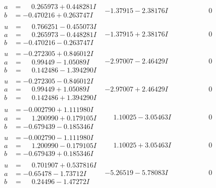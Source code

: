 \documentclass[1p]{elsarticle_modified}
\theoremstyle{definition}
\begin{document}
$$\begin{array}{c|c|c}
\begin{aligned}
a &= \phantom{-}0.265973 + 0.448281 I \\
b &= -0.470216 + 0.263747 I\end{aligned}
 & -1.37915 - 2.38176 I & \phantom{-0.000000 } 0 \\ \hline\begin{aligned}
u &= \phantom{-}0.766251 - 0.455073 I \\
a &= \phantom{-}0.265973 - 0.448281 I \\
b &= -0.470216 - 0.263747 I\end{aligned}
 & -1.37915 + 2.38176 I & \phantom{-0.000000 } 0 \\ \hline\begin{aligned}
u &= -0.272305 + 0.846012 I \\
a &= \phantom{-}0.99449 - 1.05089 I \\
b &= \phantom{-}0.142486 - 1.394290 I\end{aligned}
 & -2.97007 - 2.46429 I & \phantom{-0.000000 } 0 \\ \hline\begin{aligned}
u &= -0.272305 - 0.846012 I \\
a &= \phantom{-}0.99449 + 1.05089 I \\
b &= \phantom{-}0.142486 + 1.394290 I\end{aligned}
 & -2.97007 + 2.46429 I & \phantom{-0.000000 } 0 \\ \hline\begin{aligned}
u &= -0.002790 + 1.111980 I \\
a &= \phantom{-}1.200990 + 0.179105 I \\
b &= -0.679439 - 0.185346 I\end{aligned}
 & \phantom{-}1.10025 - 3.05463 I & \phantom{-0.000000 } 0 \\ \hline\begin{aligned}
u &= -0.002790 - 1.111980 I \\
a &= \phantom{-}1.200990 - 0.179105 I \\
b &= -0.679439 + 0.185346 I\end{aligned}
 & \phantom{-}1.10025 + 3.05463 I & \phantom{-0.000000 } 0 \\ \hline\begin{aligned}
u &= \phantom{-}0.701907 + 0.537816 I \\
a &= -0.65478 - 1.73712 I \\
b &= \phantom{-}0.24496 - 1.47272 I\end{aligned}
 & -5.26519 - 5.78083 I & \phantom{-0.000000 } 0 \\ \hline\begin{aligned}

\end{aligned}
\end{array}$$
\end{document}
